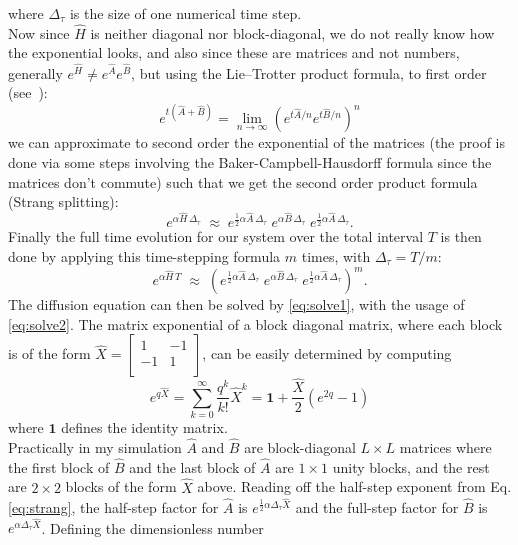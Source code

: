 \documentclass[11pt]{article}
\begin{document}
where $\Delta_\tau$ is the size of one numerical time step.\\
Now since $\hat{H}$ is neither diagonal nor block-diagonal, we do not really know how the exponential looks, and also since these are matrices and not numbers, generally $e^{\hat{H}} \neq e^{\hat{A}}e^{\hat{B}}$, but using the Lie--Trotter product formula, to first order (see~\cite{strangSplitting}):
\begin{equation}
    e^{t(\hat{A}+\hat{B})} = \lim_{n\to\infty} (e^{t\hat{A}/n} e^{t\hat{B}/n})^n
\end{equation}
we can approximate to second order the exponential of the matrices (the proof is done via some steps involving the Baker-Campbell-Hausdorff formula since the matrices don't commute) such that we get the second order product formula (Strang splitting):
\begin{equation}
    e^{\alpha \hat{H}\,\Delta_\tau} \;\approx\; e^{\tfrac{1}{2}\alpha \hat{A}\,\Delta_\tau}\; e^{\alpha \hat{B}\,\Delta_\tau}\; e^{\tfrac{1}{2}\alpha \hat{A}\,\Delta_\tau}.
    \label{eq:strang}
\end{equation}
Finally the full time evolution for our system over the total interval $T$ is then done by applying this time-stepping formula $m$ times, with $\Delta_\tau = T/m$:
\begin{equation}
    e^{\alpha \hat{H}\,T} \;\approx\; \left( e^{\tfrac{1}{2}\alpha \hat{A}\,\Delta_\tau}\; e^{\alpha \hat{B}\,\Delta_\tau}\; e^{\tfrac{1}{2}\alpha \hat{A}\,\Delta_\tau} \right)^{m}.
    \label{eq:solve2}
\end{equation}
The diffusion equation can then be solved by \ref{eq:solve1}, with the usage of \ref{eq:solve2}.
The matrix exponential of a block diagonal matrix, where each block is of the form
$
\hat{X}=
\begin{bmatrix}
     1 & -1 \\
    -1 & 1  \\
\end{bmatrix}
$, can be easily determined by computing
\begin{equation}
    e^{q\hat X}=\sum_{k=0}^{\infty} \frac{q^k}{k!}\hat X^k = \mathbf{1}+\frac{\hat{X}}{2}(e^{2q}-1)
\end{equation}
where $\mathbf{1}$ defines the identity matrix.\\
Practically in my simulation $\hat{A}$ and $\hat{B}$ are block-diagonal $L\times L$ matrices where the first block of $\hat{B}$ and the last block of $\hat{A}$ are $1\times 1$ unity blocks, and the rest are $2\times 2$ blocks of the form $\hat{X}$ above. Reading off the half-step exponent from Eq. \ref{eq:strang}, the half-step factor for $\hat{A}$ is $e^{\tfrac{1}{2}\alpha\Delta_\tau\hat{X}}$ and the full-step factor for $\hat{B}$ is $e^{\alpha\Delta_\tau\hat{X}}$. Defining the dimensionless number
\end{document}
